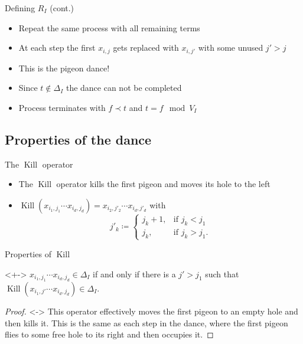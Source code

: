 \documentclass[xcolor={dvipsnames}]{beamer}
\renewcommand{\K}{\operatorname{Kill}}
\begin{document}
\begin{frame}{Defining $R_I$ (cont.)}
    \begin{itemize}[<+->]
        \item Repeat the same process with all remaining terms
        \item At each step the first $x_{i, j}$ gets replaced with $x_{i, j'}$ with some unused $j' > j$
        \item This is the pigeon dance!
        \item Since $t \not\in \Delta_I$ the dance can not be completed
        \item Process terminates with $f \prec t$ and $t = f \mod V_I$
    \end{itemize}
\end{frame}

\subsection{Properties of the dance}
\begin{frame}{The $\K$ operator}
    \begin{itemize}[<+->]
        \item The $\K$ operator kills the first pigeon and moves its hole to the left
        \item $\K(x_{i_1, j_1} \cdots x_{i_d, j_d}) = x_{i_2, j'_2} \cdots x_{i_d, j'_d}$ with\\
            $$j'_k \coloneqq \begin{cases}
                    j_k + 1, &\text{if } j_k < j_1\\
                    j_k, &\text{if } j_k > j_1.
                \end{cases}$$
    \end{itemize}
\end{frame}

\begin{frame}{Properties of $\K$}
    \begin{theorem}<+->
        $x_{i_1, j_1} \cdots x_{i_d, j_d} \in \Delta_I$ if and only if there is a $j' > j_1$ such that $\K(x_{i_1, j'} \cdots x_{i_d, j_d}) \in \Delta_I$.
    \end{theorem}
    \begin{proof}[Proof\nopunct]<->
        This operator effectively moves the first pigeon to an empty hole and then kills it. This is the same as each step in the dance, where the first pigeon flies to some free hole to its right and then occupies it.
    \end{proof}
\end{frame}
\end{document}
